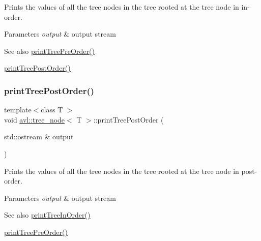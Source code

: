 Prints the values of all the tree nodes in the tree rooted at the tree node in in-\/order. 
\begin{DoxyParams}{Parameters}
{\em output} & output stream \\
\hline
\end{DoxyParams}
\begin{DoxySeeAlso}{See also}
\hyperlink{classavl_1_1tree__node_a038a1d729f32ca094e8752aba6dd9120}{print\+Tree\+Pre\+Order()} 

\hyperlink{classavl_1_1tree__node_adb0751fd04db456d5afdbe5c898da41c}{print\+Tree\+Post\+Order()} 
\end{DoxySeeAlso}
\mbox{\label{classavl_1_1tree__node_adb0751fd04db456d5afdbe5c898da41c}} 
\subsubsection{\texorpdfstring{print\+Tree\+Post\+Order()}{printTreePostOrder()}}
{\footnotesize\ttfamily template$<$class T $>$ \\
void \hyperlink{classavl_1_1tree__node}{avl\+::tree\+\_\+node}$<$ T $>$\+::print\+Tree\+Post\+Order (\begin{DoxyParamCaption}\item[{std\+::ostream \&}]{output }\end{DoxyParamCaption})}

Prints the values of all the tree nodes in the tree rooted at the tree node in post-\/order. 
\begin{DoxyParams}{Parameters}
{\em output} & output stream \\
\hline
\end{DoxyParams}
\begin{DoxySeeAlso}{See also}
\hyperlink{classavl_1_1tree__node_a51af0430883561e9d3293cb63e78003c}{print\+Tree\+In\+Order()} 

\hyperlink{classavl_1_1tree__node_a038a1d729f32ca094e8752aba6dd9120}{print\+Tree\+Pre\+Order()} 
\end{DoxySeeAlso}
\mbox{\label{classavl_1_1tree__node_a038a1d729f32ca094e8752aba6dd9120}} 
